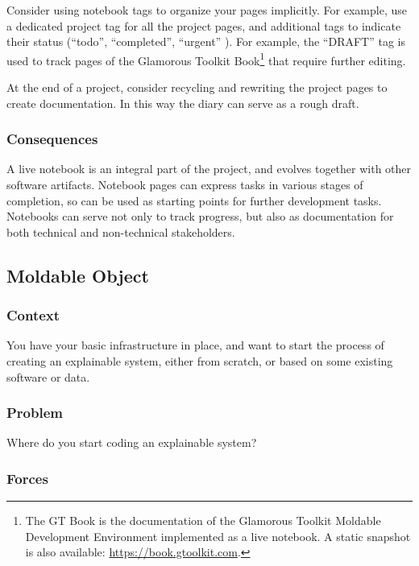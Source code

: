 \documentclass[sigconf]{acmart}
\begin{document}
Consider using notebook tags to organize your pages implicitly. For example, use a dedicated project tag for all the project pages, and additional tags to indicate their status (``todo'', ``completed'', ``urgent'' \etc).
For example, the ``DRAFT'' tag is used to track pages of the Glamorous Toolkit Book\footnote{The GT Book is the documentation of the Glamorous Toolkit Moldable Development Environment implemented as a live notebook. A static snapshot is also available: \url{https://book.gtoolkit.com}.} that require further editing.

At the end of a project, consider recycling and rewriting the project pages to create documentation. In this way the diary can serve as a rough draft.

\subsubsection*{Consequences}

A live notebook is an integral part of the project, and evolves together with other software artifacts.
Notebook pages can express tasks in various stages of completion, so can be used as starting points for further development tasks.
Notebooks can serve not only to track progress, but also as documentation for both technical and non-technical stakeholders.

\subsection*{Moldable Object}\label{pat:moldableObject}

\subsubsection*{Context}

You have your basic infrastructure in place, and want to start the process of creating an explainable system, either from scratch, or based on some existing software or data.

\subsubsection*{Problem}

Where do you start coding an explainable system?

\subsubsection*{Forces}
\end{document}
